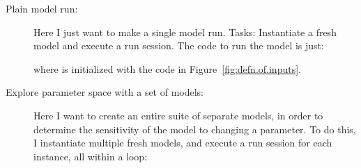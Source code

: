 \begin{description}
\item[Plain model run:]
	Here I just want to make a single model run.
	Tasks:  Instantiate a fresh model and execute a run session.
	The code to run the model is just:
	\begin{codeblock}
	\end{codeblock}
	where  is initialized with the code in
	Figure~\ref{fig:defn.of.inputs}.


\item[Explore parameter space with a set of models:]
	Here I want to create an entire suite of separate models,
	in order to determine the sensitivity of the model to changing
	a parameter.
	To do this, I
	instantiate multiple fresh models, 
	and execute a run session for each instance, all within
	a  loop:


\begin{latexonly}
	\begin{codeblock}
	\end{codeblock}
\end{latexonly}


\end{description}
